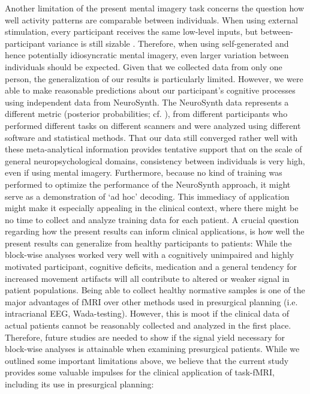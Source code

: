 \documentclass[fleqn,10pt]{SelfArx} %
\begin{document}
Another limitation of the present mental imagery task concerns the question how well activity patterns are comparable between individuals. When using external stimulation, every participant receives the same low-level inputs, but between-participant variance is still sizable \citep{Haxby_2011}. Therefore, when using self-generated and hence potentially idiosyncratic mental imagery, even larger variation between individuals should be expected. Given that we collected data from only one person, the generalization of our results is particularly limited. However, we were able to make reasonable predictions about our participant's cognitive processes using independent data from NeuroSynth. The NeuroSynth data represents a different metric (posterior probabilities; cf. \citet{Yarkoni_2011}), from different participants who performed different tasks on different scanners and were analyzed using different software and statistical methods. That our data still converged rather well with these meta-analytical information provides tentative support that on the scale of general neuropsychological domains, consistency between individuals is very high, even if using mental imagery. Furthermore, because no kind of training was performed to optimize the performance of the NeuroSynth approach, it might serve as a demonstration of ‘ad hoc’ decoding. This immediacy of application might make it especially appealing in the clinical context, where there might be no time to collect and analyze training data for each patient.
A crucial question regarding how the present results can inform clinical applications, is how well the present results can generalize from healthy participants to patients: While the block-wise analyses worked very well with a cognitively unimpaired and highly motivated participant, cognitive deficits, medication and a general tendency for increased movement artifacts \citep{Van_Dijk_2012} will all contribute to altered or weaker signal in patient populations. Being able to collect healthy normative samples \citep{Dubois_2016} is one of the major advantages of fMRI over other methods used in presurgical planning (i.e. intracrianal EEG, Wada-testing). However, this is moot if the clinical data of actual patients cannot be reasonably collected and analyzed in the first place. Therefore, future studies are needed to show if the signal yield necessary for block-wise analyses is attainable when examining presurgical patients.
While we outlined some important limitations above, we believe that the current study provides some valuable impulses for the clinical application of task-fMRI, including its use in presurgical planning: \\
\end{document}
